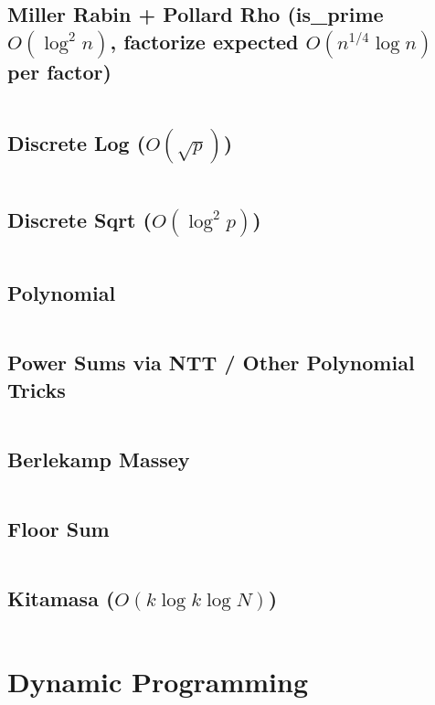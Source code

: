 \documentclass[8pt, a4paper, oneside]{extarticle}
\begin{document}
\begin{multicols*}{2}
\subsection{Miller Rabin + Pollard Rho (is\_prime $O(\log^2 n)$, factorize expected $O(n^{1/4} \log n)$ per factor)}
\inputminted{c++}{codes/mathematics/miller_rabin_pollard_rho.cpp}

\subsection{Discrete Log ($O(\sqrt{p})$)}
\inputminted{c++}{codes/mathematics/discrete_log.cpp}

\subsection{Discrete Sqrt ($O(\log^2 p)$)}
\inputminted{c++}{codes/mathematics/discrete_sqrt.cpp}

\subsection{Polynomial}
\inputminted{c++}{codes/mathematics/polynomial.cpp}

\subsection{Power Sums via NTT / Other Polynomial Tricks}
\inputminted{c++}{codes/mathematics/power_sum_ntt.cpp}

\subsection{Berlekamp Massey}
\inputminted{c++}{codes/mathematics/berlekamp_massey.cpp}

\subsection{Floor Sum}
\inputminted{c++}{codes/mathematics/floor_sum.cpp}

\subsection{Kitamasa ($O(k \log k \log N)$)}
\inputminted{c++}{codes/mathematics/kitamasa.cpp}

\section{Dynamic Programming}

\end{multicols*}
\end{document}
